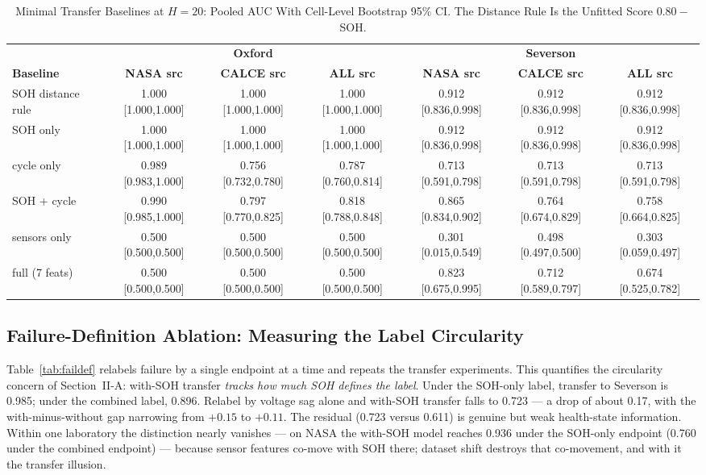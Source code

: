 \documentclass[11pt,a4paper]{article}
\begin{document}
\begin{table}[!t]
\caption{Minimal Transfer Baselines at $H{=}20$: Pooled AUC With Cell-Level Bootstrap 95\% CI. The Distance Rule Is the Unfitted Score $0.80-$SOH.}
\label{tab:baselines}
\centering
\scriptsize
\setlength{\tabcolsep}{2.5pt}
\begin{tabular}{lcccccc}
\toprule
 & \multicolumn{3}{c}{\textbf{Oxford}} & \multicolumn{3}{c}{\textbf{Severson}}\\
\cmidrule(lr){2-4}\cmidrule(l){5-7}
\textbf{Baseline} & \textbf{NASA src} & \textbf{CALCE src} & \textbf{ALL src} & \textbf{NASA src} & \textbf{CALCE src} & \textbf{ALL src}\\
\midrule
SOH distance rule & 1.000 [1.000,1.000] & 1.000 [1.000,1.000] & 1.000 [1.000,1.000] & 0.912 [0.836,0.998] & 0.912 [0.836,0.998] & 0.912 [0.836,0.998] \\
SOH only & 1.000 [1.000,1.000] & 1.000 [1.000,1.000] & 1.000 [1.000,1.000] & 0.912 [0.836,0.998] & 0.912 [0.836,0.998] & 0.912 [0.836,0.998] \\
cycle only & 0.989 [0.983,1.000] & 0.756 [0.732,0.780] & 0.787 [0.760,0.814] & 0.713 [0.591,0.798] & 0.713 [0.591,0.798] & 0.713 [0.591,0.798] \\
SOH + cycle & 0.990 [0.985,1.000] & 0.797 [0.770,0.825] & 0.818 [0.788,0.848] & 0.865 [0.834,0.902] & 0.764 [0.674,0.829] & 0.758 [0.664,0.825] \\
sensors only & 0.500 [0.500,0.500] & 0.500 [0.500,0.500] & 0.500 [0.500,0.500] & 0.301 [0.015,0.549] & 0.498 [0.497,0.500] & 0.303 [0.059,0.497] \\
full (7 feats) & 0.500 [0.500,0.500] & 0.500 [0.500,0.500] & 0.500 [0.500,0.500] & 0.823 [0.675,0.995] & 0.712 [0.589,0.797] & 0.674 [0.525,0.782] \\
\bottomrule
\end{tabular}
\end{table}

\subsection{Failure-Definition Ablation: Measuring the Label Circularity}
Table~\ref{tab:faildef} relabels failure by a single endpoint at a time and repeats the transfer experiments. This quantifies the circularity concern of Section~II-A: with-SOH transfer \emph{tracks how much SOH defines the label}. Under the SOH-only label, transfer to Severson is 0.985; under the combined label, 0.896. Relabel by voltage sag alone and with-SOH transfer falls to 0.723 --- a drop of about 0.17, with the with-minus-without gap narrowing from $+0.15$ to $+0.11$. The residual (0.723 versus 0.611) is genuine but weak health-state information. Within one laboratory the distinction nearly vanishes --- on NASA the with-SOH model reaches 0.936 under the SOH-only endpoint (0.760 under the combined endpoint) --- because sensor features co-move with SOH there; dataset shift destroys that co-movement, and with it the transfer illusion.
\end{document}
